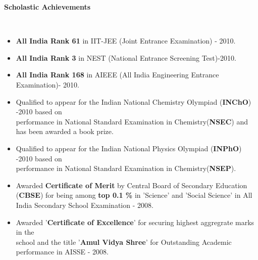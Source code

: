 \documentclass[a4paper,11pt]{article}
\newcommand{\lsep}{-0.5cm}
\newcommand{\resheading}[1]{{\small \colorbox{mygrey}{\begin{minipage}{0.975\textwidth}{\textbf{#1 \vphantom{p\^{E}}}}\end{minipage}}}}
\begin{document}
\resheading{\textbf{\large Scholastic Achievements}}\\[\lsep]
\begin{itemize}
  \item \textbf{All India Rank 61} in IIT-JEE (Joint Entrance Examination) - 2010.\\[-0.7cm]
  \item \textbf{All India Rank 3} in NEST (National Entrance Screening Test)-2010.\\[-0.7cm]
  \item \textbf{All India Rank 168} in AIEEE (All India Engineering Entrance Examination)- 2010.

 \item Qualified to appear for the Indian National Chemistry Olympiad (\textbf{INChO}) -2010 based on \\performance in National Standard Examination in Chemistry(\textbf{NSEC}) and has been awarded a book prize.\\[-0.7cm]
  \item Qualified to appear for the Indian National Physics Olympiad (\textbf{INPhO}) -2010 based on \\ performance in National Standard Examination in Chemistry(\textbf{NSEP}).  
  
  \item Awarded \textbf{Certificate of Merit} by Central Board of Secondary Education (\textbf{CBSE}) for being among \textbf{top 0.1 \%} in 'Science' and 'Social Science' in All India Secondary School Examination - 2008. \\[-0.7cm]
 \item Awarded '\textbf{Certificate of Excellence}' for securing highest aggregrate marks in the \\ school and  the title '\textbf{Amul Vidya Shree}' for Outstanding Academic performance in AISSE - 2008.


\end{itemize}
\end{document}
